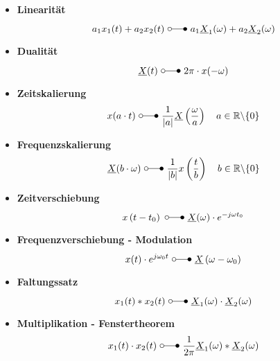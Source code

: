 \begin{mdframed}[style=exercise,nobreak=false]
\begin{itemize}
    \item \textbf{Linearität}
    \[
        a_{1} x_{1}(t)+a_{2} x_{2}(t)\ \laplace\  a_{1} \underline{X}_{1}(\omega)+a_{2} \underline{X}_{2}(\omega)
    \]

    \item \textbf{Dualität}
    \[
        \underline{X}(t)\ \laplace\  2\pi\cdot x(-\omega)
    \]
\item \textbf{Zeitskalierung}
    \[
        x(a \cdot t)\ \laplace\ \frac{1}{|a|} \underline{X}\left(\frac{\omega}{a}\right) \quad a \in \mathbb{R} \backslash\{0\}
    \]
\item \textbf{Frequenzskalierung}
    \[
        \underline{X}(b\cdot\omega)\ \laplace\ \frac{1}{|b|} x\left(\frac{t}{b}\right) \quad b \in \mathbb{R} \backslash\{0\}
    \]
\item \textbf{Zeitverschiebung}
    \[
        x\left(t-t_{0}\right)\ \laplace\ \underline{X}(\omega) \cdot e^{-j \omega t_{0}}
    \]
\item \textbf{Frequenzverschiebung - Modulation}
    \[
        x(t) \cdot e^{j \omega_{0} t}\ \laplace\ \underline{X}\left(\omega-\omega_{0}\right)
    \]
\item \textbf{Faltungssatz}
    \[
        x_{1}(t) * x_{2}(t)\ \laplace\ \underline{X}_{1}(\omega) \cdot \underline{X}_{2}(\omega)
    \]
\item \textbf{Multiplikation - Fenstertheorem}
    \[
        x_{1}(t) \cdot x_{2}(t)\ \laplace\ \frac{1}{2 \pi} \underline{X}_{1}(\omega) * \underline{X}_{2}(\omega)
\]
\end{itemize}
\end{mdframed}
